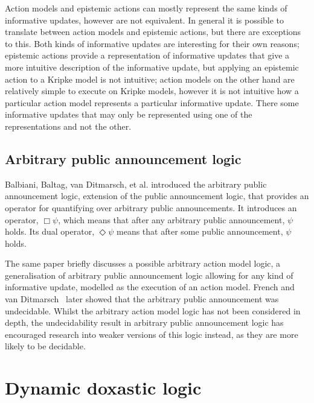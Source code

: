 Action models and epistemic actions can mostly represent the same kinds of
informative updates, however are not equivalent. In general it is possible to
translate between action models and epistemic actions, but there are exceptions
to this. %
Both kinds of informative updates are interesting for their own reasons;
epistemic actions provide a representation of informative updates that give a
more intuitive description of the informative update, but applying an
epistemic action to a Kripke model is not intuitive; action models on the other
hand are relatively simple to execute on Kripke models, however it is not
intuitive how a particular action model represents a particular informative
update. There some informative updates that may only be represented using one of
the representations and not the other.

\subsection*{Arbitrary public announcement logic}

Balbiani, Baltag, van Ditmarsch, et al.\cite{balbiani2007arbitrary} introduced
the arbitrary public announcement logic, extension of the public announcement
logic, that provides an operator for quantifying over arbitrary public
announcements. It introduces an operator, $\Box\psi$, which means that after
any arbitrary public announcement, $\psi$ holds. Its dual operator,
$\Diamond\psi$ means that after some public announcement, $\psi$ holds.

The same paper briefly discusses a possible arbitrary action model logic, a
generalisation of arbitrary public announcement logic allowing for any kind of
informative update, modelled as the execution of an action model. French and
van Ditmarsch~\cite{french2008undecidability} later showed that the arbitrary
public announcement was undecidable. Whilst the arbitrary action model logic has
not been considered in depth, the undecidability result in arbitrary public
announcement logic has encouraged research into weaker versions of this logic
instead, as they are more likely to be decidable.

\section{Dynamic doxastic logic}

